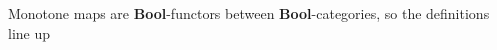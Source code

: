 Monotone maps are \textbf{Bool}-functors between \textbf{Bool}-categories, so the definitions line up
